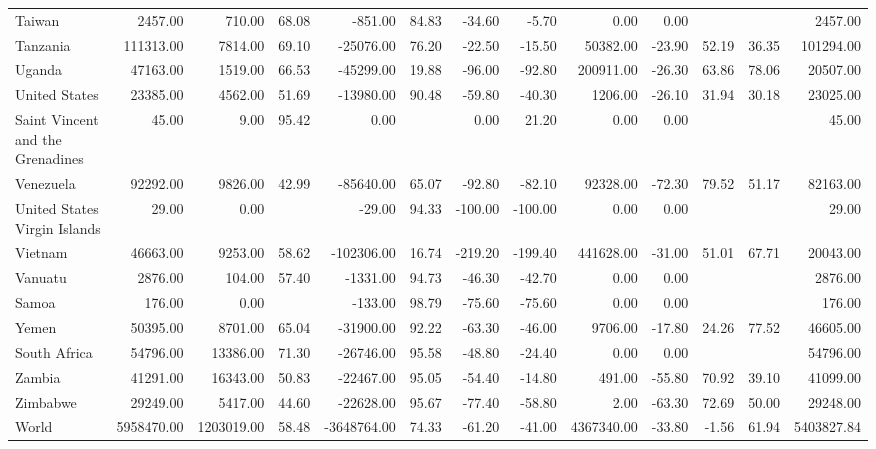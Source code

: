 \begin{table}[ht]
\begin{tabular}{lrrrrrrrrrrrr}
  Taiwan & 2457.00 & 710.00 & 68.08 & -851.00 & 84.83 & -34.60 & -5.70 & 0.00 & 0.00 &  &  & 2457.00 \\ 
  Tanzania & 111313.00 & 7814.00 & 69.10 & -25076.00 & 76.20 & -22.50 & -15.50 & 50382.00 & -23.90 & 52.19 & 36.35 & 101294.00 \\ 
  Uganda & 47163.00 & 1519.00 & 66.53 & -45299.00 & 19.88 & -96.00 & -92.80 & 200911.00 & -26.30 & 63.86 & 78.06 & 20507.00 \\ 
  United States & 23385.00 & 4562.00 & 51.69 & -13980.00 & 90.48 & -59.80 & -40.30 & 1206.00 & -26.10 & 31.94 & 30.18 & 23025.00 \\ 
  Saint Vincent and the Grenadines & 45.00 & 9.00 & 95.42 & 0.00 &  & 0.00 & 21.20 & 0.00 & 0.00 &  &  & 45.00 \\ 
  Venezuela & 92292.00 & 9826.00 & 42.99 & -85640.00 & 65.07 & -92.80 & -82.10 & 92328.00 & -72.30 & 79.52 & 51.17 & 82163.00 \\ 
  United States Virgin Islands & 29.00 & 0.00 &  & -29.00 & 94.33 & -100.00 & -100.00 & 0.00 & 0.00 &  &  & 29.00 \\ 
  Vietnam & 46663.00 & 9253.00 & 58.62 & -102306.00 & 16.74 & -219.20 & -199.40 & 441628.00 & -31.00 & 51.01 & 67.71 & 20043.00 \\ 
  Vanuatu & 2876.00 & 104.00 & 57.40 & -1331.00 & 94.73 & -46.30 & -42.70 & 0.00 & 0.00 &  &  & 2876.00 \\ 
  Samoa & 176.00 & 0.00 &  & -133.00 & 98.79 & -75.60 & -75.60 & 0.00 & 0.00 &  &  & 176.00 \\ 
  Yemen & 50395.00 & 8701.00 & 65.04 & -31900.00 & 92.22 & -63.30 & -46.00 & 9706.00 & -17.80 & 24.26 & 77.52 & 46605.00 \\ 
  South Africa & 54796.00 & 13386.00 & 71.30 & -26746.00 & 95.58 & -48.80 & -24.40 & 0.00 & 0.00 &  &  & 54796.00 \\ 
  Zambia & 41291.00 & 16343.00 & 50.83 & -22467.00 & 95.05 & -54.40 & -14.80 & 491.00 & -55.80 & 70.92 & 39.10 & 41099.00 \\ 
  Zimbabwe & 29249.00 & 5417.00 & 44.60 & -22628.00 & 95.67 & -77.40 & -58.80 & 2.00 & -63.30 & 72.69 & 50.00 & 29248.00 \\ 
  World & 5958470.00 & 1203019.00 & 58.48 & -3648764.00 & 74.33 & -61.20 & -41.00 & 4367340.00 & -33.80 & -1.56 & 61.94 & 5403827.84 \\ 
   \hline
\end{tabular}
\end{table}
